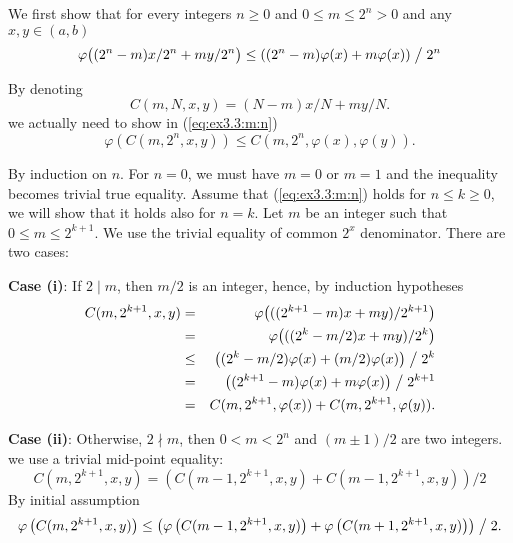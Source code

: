 \begin{enumerate}
We first show that for every integers \(n\geq 0\) and
\(0\leq m \leq 2^n > 0\)
and any \(x,y\in (a,b)\)
\begin{equation} \label{eq:ex3.3:m:n}
 \varphi\bigl((2^n-m)x/2^n + my/2^n\bigr) \leq
  \left((2^n-m)\varphi(x) + m\varphi(x)\right)\bigm/2^n
\end{equation}

By denoting
\begin{equation}
C(m,N,x,y) = (N-m)x/N + my/N.
\end{equation}
we actually need to show in (\ref{eq:ex3.3:m:n})
\begin{equation}  \label{eq:ex3.3:m:n:C}
  \varphi(C(m,2^n,x,y)) \leq C(m,2^n,\varphi(x), \varphi(y)).
\end{equation}



By induction on $n$. For \(n=0\), we must have \(m=0\) or \(m=1\)
and the inequality becomes trivial true equality.
Assume that (\ref{eq:ex3.3:m:n}) holds for \(n\leq k\geq 0\), we will show
that it holds also for \(n=k\).
Let $m$ be an integer such that \(0\leq m \leq 2^{k+1}\).
We use the trivial equality of common \(2^x\) denominator.
There are two cases:

 \textbf{Case (i)}:
   If \(2\mid m\), then \(m/2\) is an integer, hence, by induction hypotheses
 \begin{eqnarray*}
  C(m,2^{k+1},x,y)
  &=&     \varphi\bigl(((2^{k+1}-m)x + my)/2^{k+1}\bigr) \\
  &=&     \varphi\bigl(((2^k-m/2)x + my)/2^k\bigr) \\
  &\leq&  \left((2^k-m/2)\varphi(x) + (m/2)\varphi(x)\right)\bigm/2^k \\
  &=&     \left((2^{k+1}-m)\varphi(x) + m\varphi(x)\right)\bigm/2^{k+1} \\
  &=&     C(m,2^{k+1},\varphi(x)) + C(m,2^{k+1},\varphi(y)).
 \end{eqnarray*}

\textbf{Case (ii)}:
Otherwise,
\(2\nmid m\), then \(0<m<2^n\) and \((m\pm 1)/2\) are two integers.
  we use a trivial mid-point equality:
  \begin{equation*}
  C(m,2^{k+1},x,y) = \left( C(m-1,2^{k+1},x,y) + C(m-1,2^{k+1},x,y) \right) / 2
  \end{equation*}
  By initial assumption
  \begin{equation} \label{eq:ex3.3:m:mid}
  \varphi\left(C(m,2^{k+1},x,y)\right)
   \leq
    \left(\varphi\left(C(m-1,2^{k+1},x,y)\right) +
          \varphi\left(C(m+1,2^{k+1},x,y)\right) \right) \bigm / 2.
  \end{equation}


\end{enumerate}
